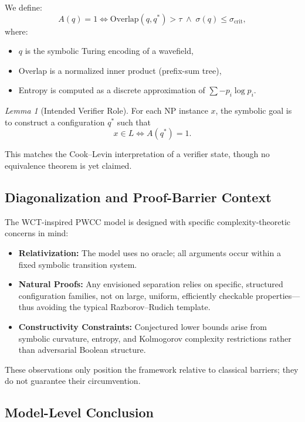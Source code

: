 \documentclass[12pt]{article}
\theoremstyle{remark}
\newtheorem{lemma}[theorem]{Lemma}
\begin{document}
We define:
\[
A(q)=1 
\iff 
\mathrm{Overlap}(q, q^*) > \tau 
\;\land\;
\sigma(q) \le \sigma_{\text{crit}},
\]
where:
\begin{itemize}
  \item \(q\) is the symbolic Turing encoding of a wavefield,
  \item Overlap is a normalized inner product (prefix-sum tree),
  \item Entropy is computed as a discrete approximation of $\sum -p_i \log p_i$.
\end{itemize}

\begin{lemma}[Intended Verifier Role]
For each NP instance \(x\), the symbolic goal is to construct a configuration \(q^*\)
such that
\[
x \in L \iff A(q^*) = 1.
\]
\end{lemma}

This matches the Cook–Levin interpretation of a verifier state, though no equivalence
theorem is yet claimed.

\subsection{Diagonalization and Proof-Barrier Context}

The WCT-inspired PWCC model is designed with specific complexity-theoretic concerns
in mind:

\begin{itemize}
  \item \textbf{Relativization:}  
        The model uses no oracle; all arguments occur within a fixed symbolic
        transition system.

  \item \textbf{Natural Proofs:}  
        Any envisioned separation relies on specific, structured configuration families,
        not on large, uniform, efficiently checkable properties—thus avoiding the typical
        Razborov–Rudich template.

  \item \textbf{Constructivity Constraints:}  
        Conjectured lower bounds arise from symbolic curvature, entropy, and
        Kolmogorov complexity restrictions rather than adversarial Boolean structure.
\end{itemize}

These observations only position the framework relative to classical barriers; they do
not guarantee their circumvention.

\subsection{Model-Level Conclusion}
\end{document}
